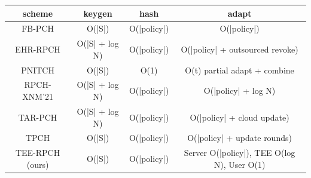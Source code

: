 \begin{tabular}{c c c c}
\toprule
scheme & keygen & hash & adapt \\
\midrule
FB-PCH & O(|S|) & O(|policy|) & O(|policy|) \\
EHR-RPCH & O(|S| + log N) & O(|policy|) & O(|policy| + outsourced revoke) \\
PNITCH & O(|S|) & O(1) & O(t) partial adapt + combine \\
RPCH-XNM'21 & O(|S| + log N) & O(|policy|) & O(|policy| + log N) \\
TAR-PCH & O(|S| + log N) & O(|policy|) & O(|policy| + cloud update) \\
TPCH & O(|S|) & O(|policy|) & O(|policy| + update rounds) \\
TEE-RPCH (ours) & O(|S|) & O(|policy|) & Server O(|policy|), TEE O(log N), User O(1) \\
\bottomrule
\end{tabular}
